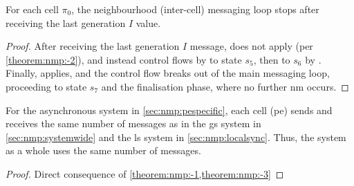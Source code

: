 \begin{theorem}\label{theorem:nmp:-3}
    For each cell $\pi_0$, the neighbourhood (inter-cell) messaging loop stops after receiving the last generation $I$ value.
\end{theorem}

\begin{proof}
    After receiving the last generation \(I\) message,  does not apply (per \cref{theorem:nmp:-2}), and instead control flows by  to state \(s_5\), then to \(s_6\) by .  Finally,  applies, and the control flow breaks out of the main messaging loop, proceeding to state \(s_7\) and the finalisation phase, where no further \gls{nm} occurs. 
\end{proof}

\begin{theorem}\label{theorem:nmp:-4}
    For the asynchronous system in \cref{sec:nmp:pespecific}, 
    each cell (\gls{pe}) sends and receives the same number of messages as in the \gls{gs} system in \cref{sec:nmp:systemwide} and the \gls{ls} system in \cref{sec:nmp:localsync}.   
    Thus, the system as a whole uses the same number of messages.
\end{theorem}

\begin{proof}
    Direct consequence of \cref{theorem:nmp:-1,theorem:nmp:-3}
\end{proof}

